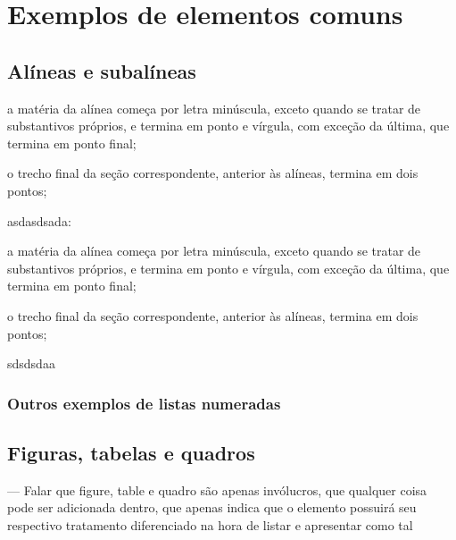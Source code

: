 \chapter{Exemplos de elementos comuns}
\section{Alíneas e subalíneas}
  \lipsum[1-1]
  \begin{alinea}
    \item a matéria da alínea começa por letra minúscula, exceto quando se tratar de     substantivos próprios, e termina em ponto e vírgula, com exceção da última, que termina em ponto final; 
    \item o trecho final da seção correspondente, anterior às alíneas, termina em
    dois pontos;
    \item asdasdsada: 
    \begin{subalinea}
      \item a matéria da alínea começa por letra minúscula, exceto quando se tratar de     substantivos próprios, e termina em ponto e vírgula, com exceção da última, que termina em ponto final; 
      \item o trecho final da seção correspondente, anterior às alíneas, termina em
      dois pontos;
    \end{subalinea}
    \item sdsdsdaa
  \end{alinea}

  \subsection{Outros exemplos de listas numeradas}

\section{Figuras, tabelas e quadros}
  --- Falar que figure, table e quadro são apenas invólucros, que qualquer coisa pode ser adicionada dentro, que apenas indica que o elemento possuirá seu respectivo tratamento diferenciado na hora de listar e apresentar como tal
  
